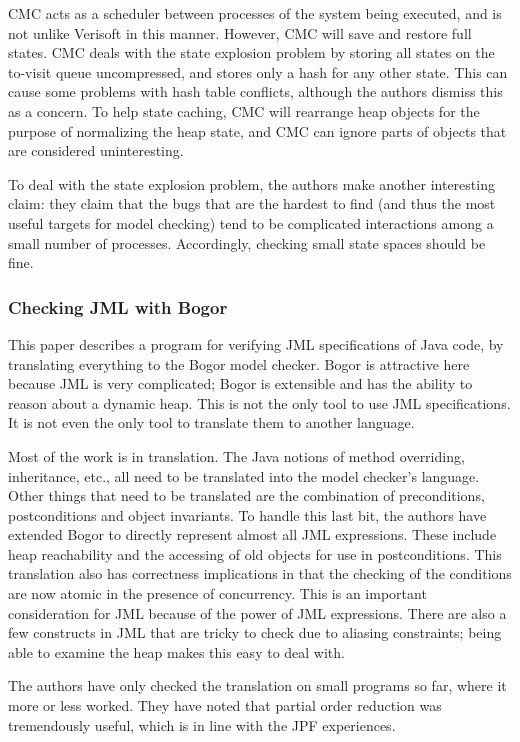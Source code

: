 \documentclass{article}
\begin{document}
\begin{multicols}{2}
CMC acts as a scheduler between processes of the system being
executed, and is not unlike Verisoft in this manner.  However, CMC
will save and restore full states.  CMC deals with the state explosion
problem by storing all states on the to-visit queue uncompressed, and
stores only a hash for any other state.  This can cause some problems
with hash table conflicts, although the authors dismiss this as a
concern.  To help state caching, CMC will rearrange heap objects for
the purpose of normalizing the heap state, and CMC can ignore parts of
objects that are considered uninteresting.

To deal with the state explosion problem, the authors make another
interesting claim: they claim that the bugs that are the hardest to
find (and thus the most useful targets for model checking) tend to be
complicated interactions among a small number of processes.
Accordingly, checking small state spaces should be fine.

\subsubsection{Checking JML with Bogor~\cite{Robby-etal:TACAS2004}}

This paper describes a program for verifying JML specifications of
Java code, by translating everything to the Bogor model checker.
Bogor is attractive here because JML is very complicated; Bogor is
extensible and has the ability to reason about a dynamic heap.  This
is not the only tool to use JML specifications.  It is not even the
only tool to translate them to another language.

Most of the work is in translation.  The Java notions of method
overriding, inheritance, etc., all need to be translated into the
model checker's language.  Other things that need to be translated are
the combination of preconditions, postconditions and object
invariants.  To handle this last bit, the authors have extended Bogor
to directly represent almost all JML expressions.  These include heap
reachability and the accessing of old objects for use in
postconditions.  This translation also has correctness implications in
that the checking of the conditions are now atomic in the presence of
concurrency.  This is an important consideration for JML because of
the power of JML expressions.  There are also a few constructs in JML
that are tricky to check due to aliasing constraints; being able to
examine the heap makes this easy to deal with.

The authors have only checked the translation on small programs so
far, where it more or less worked.  They have noted that partial order
reduction was tremendously useful, which is in line with the JPF
experiences.


\end{multicols}
\end{document}
